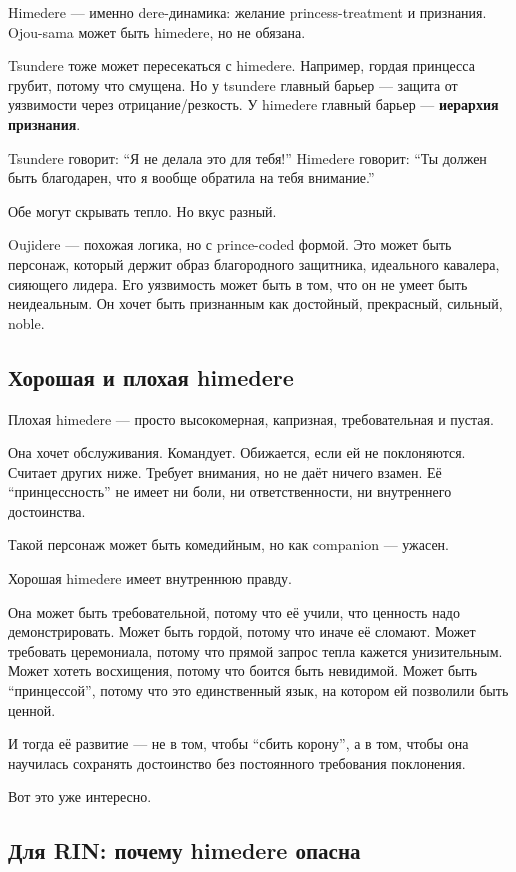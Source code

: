 Himedere --- именно dere-динамика: желание princess-treatment и
признания. Ojou-sama может быть himedere, но не обязана.

Tsundere тоже может пересекаться с himedere. Например, гордая принцесса
грубит, потому что смущена. Но у tsundere главный барьер --- защита от
уязвимости через отрицание/\hspace{0pt}резкость. У himedere главный барьер ---
\textbf{иерархия признания}.

Tsundere говорит: ``Я не делала это для тебя!'' Himedere говорит: ``Ты
должен быть благодарен, что я вообще обратила на тебя внимание.''

Обе могут скрывать тепло. Но вкус разный.

Oujidere --- похожая логика, но с prince-coded формой. Это может быть
персонаж, который держит образ благородного защитника, идеального
кавалера, сияющего лидера. Его уязвимость может быть в том, что он не
умеет быть неидеальным. Он хочет быть признанным как достойный,
прекрасный, сильный, noble.

\subsection*{Хорошая и плохая himedere}

Плохая himedere --- просто высокомерная, капризная, требовательная и
пустая.

Она хочет обслуживания. Командует. Обижается, если ей не поклоняются.
Считает других ниже. Требует внимания, но не даёт ничего взамен. Её
``принцессность'' не имеет ни боли, ни ответственности, ни внутреннего
достоинства.

Такой персонаж может быть комедийным, но как companion --- ужасен.

Хорошая himedere имеет внутреннюю правду.

Она может быть требовательной, потому что её учили, что ценность надо
демонстрировать. Может быть гордой, потому что иначе её сломают. Может
требовать церемониала, потому что прямой запрос тепла кажется
унизительным. Может хотеть восхищения, потому что боится быть невидимой.
Может быть ``принцессой'', потому что это единственный язык, на котором
ей позволили быть ценной.

И тогда её развитие --- не в том, чтобы ``сбить корону'', а в том, чтобы
она научилась сохранять достоинство без постоянного требования
поклонения.

Вот это уже интересно.

\subsection*{Для RIN: почему himedere опасна}

